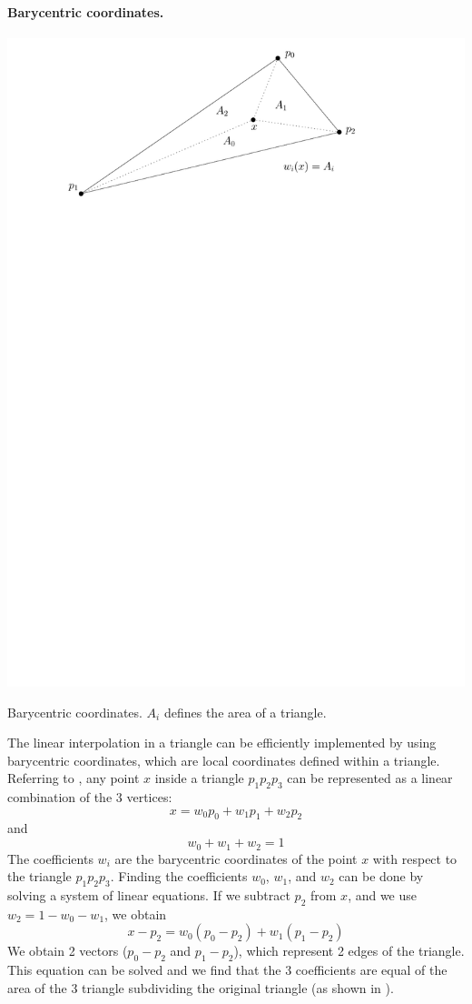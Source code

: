 \paragraph{Barycentric coordinates.}
\begin{marginfigure}
  \centering
  \includegraphics[width=\textwidth]{figs/li}
  \caption{Barycentric coordinates. $A_i$ defines the area of a triangle.} %
\end{marginfigure}
The linear interpolation in a triangle can be efficiently implemented by using barycentric coordinates, which are local coordinates defined within a triangle.
Referring to , any point $x$ inside a triangle $p_1p_2p_3$ can be represented as a linear combination of the 3 vertices:
\[
  x = w_0p_0 + w_1p_1 + w_2p_2
\]
and 
\[
  w_0 + w_1 + w_2 = 1   
\]
The coefficients $w_i$ are the barycentric coordinates of the point $x$ with respect to the triangle $p_1p_2p_3$.
Finding the coefficients $w_0$, $w_1$, and $w_2$ can be done by solving a system of linear equations.
If we subtract $p_2$ from $x$, and we use $w_2 = 1 - w_0 - w_1$, we obtain
\[
  x - p_2 = w_0(p_0-p_2) + w_1(p_1 - p_2)
\]
We obtain 2 vectors ($p_0-p_2$ and $p_1-p_2$), which represent 2 edges of the triangle.
This equation can be solved and we find that the 3 coefficients are equal of the area of the 3 triangle subdividing the original triangle (as shown in ).


